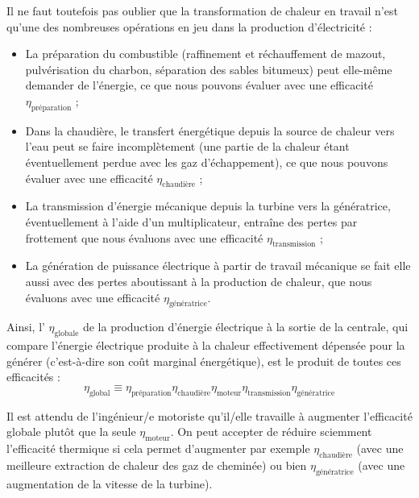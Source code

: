 		Il ne faut toutefois pas oublier que la transformation de chaleur en travail n’est qu’une des nombreuses opérations en jeu dans la production d’électricité :
		\begin{itemize}
			\item La préparation du combustible (raffinement et réchauffement de mazout, pulvérisation du charbon, séparation des sables bitumeux) peut elle-même demander de l’énergie, ce que nous pouvons évaluer avec une efficacité $\eta_\text{préparation}$ ;
			\item Dans la chaudière, le transfert énergétique depuis la source de chaleur vers l’eau peut se faire incomplètement (une partie de la chaleur étant éventuellement perdue avec les gaz d’échappement), ce que nous pouvons évaluer avec une efficacité $\eta_\text{chaudière}$ ;
			\item La transmission d’énergie mécanique depuis la turbine vers la génératrice, éventuellement à l’aide d’un multiplicateur, entraîne des pertes par frottement que nous évaluons avec une efficacité $\eta_\text{transmission}$ ;
			\item La génération de puissance électrique à partir de travail mécanique se fait elle aussi avec des pertes aboutissant à la production de chaleur, que nous évaluons avec une efficacité $\eta_\text{génératrice}$.
		\end{itemize}
		
		Ainsi, l’ $\eta_\text{globale}$ de la production d’énergie électrique à la sortie de la centrale, qui compare l’énergie électrique produite à la chaleur effectivement dépensée pour la générer (c’est-à-dire son coût marginal énergétique), est le produit de toutes ces efficacités :
		\begin{equation}
			\eta_\text{global} \equiv \eta_\text{préparation} \eta_\text{chaudière} \eta_\text{moteur} \eta_\text{transmission} \eta_\text{génératrice}
		\end{equation}
		
		Il est attendu de l’ingénieur/e motoriste qu’il/elle travaille à augmenter l’efficacité globale plutôt que la seule $\eta_\text{moteur}$. On peut accepter de réduire sciemment l’efficacité thermique si cela permet d’augmenter par exemple $\eta_\text{chaudière}$ (avec une meilleure extraction de chaleur des gaz de cheminée) ou bien $\eta_\text{génératrice}$ (avec une augmentation de la vitesse de la turbine).

